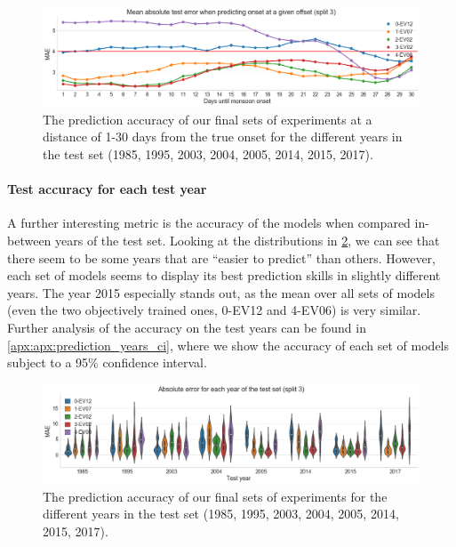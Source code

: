\begin{figure}[h!]
  \centering
  \includegraphics[width=\linewidth]{./99_appendix/img/prediction_accuracy_offset}
  \caption{The prediction accuracy of our final sets of experiments at a distance of 1-30 days from the true onset for the different years in the test set (1985, 1995, 2003, 2004, 2005, 2014, 2015, 2017).}
  \label{fig:e4_prediction_accuracy_offset}
\end{figure}

\paragraph{Test accuracy for each test year}
A further interesting metric is the accuracy of the models when compared in-between years of the test set. Looking at the distributions in \cref{fig:e4_prediction_years}, we can see that there seem to be some years that are ``easier to predict'' than others. However, each set of models seems to display its best prediction skills in slightly different years. The year 2015 especially stands out, as the mean over all sets of models (even the two objectively trained ones, 0-EV12 and 4-EV06) is very similar. Further analysis of the accuracy on the test years can be found in \cref{apx:apx:prediction_years_ci}, where we show the accuracy of each set of models subject to a 95\% confidence interval.

\begin{figure}[h!]
  \centering
  \includegraphics[width=\linewidth]{./99_appendix/img/prediction_years}
  \caption{The prediction accuracy of our final sets of experiments for the different years in the test set (1985, 1995, 2003, 2004, 2005, 2014, 2015, 2017).}
  \label{fig:e4_prediction_years}
\end{figure}

